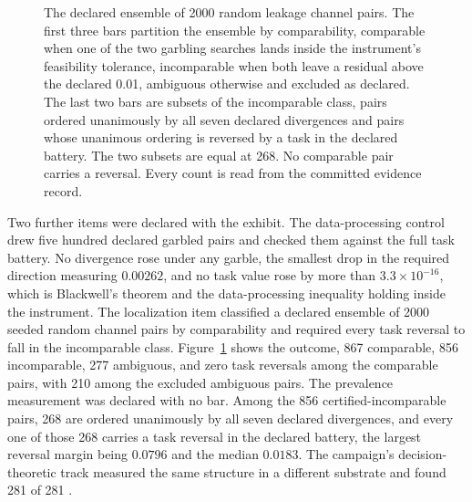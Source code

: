 \documentclass[aps,pre,reprint,nofootinbib]{revtex4-2}
\begin{document}
\begin{figure}[t]
\centering
{}
\caption{The declared ensemble of 2000 random leakage channel pairs.
The first three bars partition the ensemble by comparability,
comparable when one of the two garbling searches lands inside the
instrument's feasibility tolerance, incomparable when both leave a
residual above the declared 0.01, ambiguous otherwise and
excluded as declared.  The last two bars are subsets of the
incomparable class, pairs ordered unanimously by all seven declared
divergences and pairs whose unanimous ordering is reversed by a task
in the declared battery.  The two subsets are equal at 268.  No
comparable pair carries a reversal.  Every count is read from the
committed evidence record.}
\label{fig:cr2}
\end{figure}

Two further items were declared with the exhibit.  The
data-processing control drew five hundred declared garbled pairs and
checked them against the full task battery.  No divergence rose under
any garble, the smallest drop in the required direction measuring
$0.00262$, and no task value rose by more than
$3.3 \times 10^{-16}$, which is Blackwell's theorem and the
data-processing inequality holding inside the instrument.
The localization item classified a declared ensemble of
2000 seeded random channel pairs by comparability and required every
task reversal to fall in the incomparable class.
Figure~\ref{fig:cr2} shows the outcome, 867 comparable, 856
incomparable, 277 ambiguous, and zero task reversals among the
comparable pairs, with 210 among the excluded ambiguous pairs.  The
prevalence measurement was declared with no bar.  Among the 856
certified-incomparable pairs, 268 are ordered unanimously by all
seven declared divergences, and every one of those 268 carries a task
reversal in the declared battery, the largest reversal margin being
$0.0796$ and the median $0.0183$.  The campaign's decision-theoretic
track measured the same structure in a different substrate and found
281 of 281 \cite{GamesPaper}.
\end{document}

